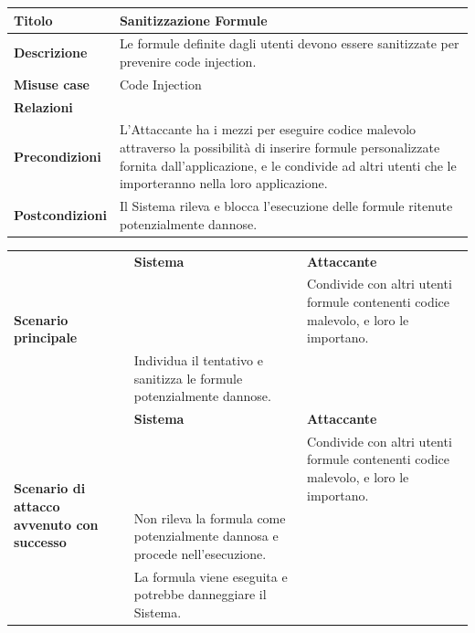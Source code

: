 \documentclass[a4paper, 11pt]{article}
\begin{document}
\clearpage
\begin{table}[h]\small
\begin{center}
\begin{tabular}{ |p{4cm}|p{11cm}|  }
\hline
\textbf{Titolo} & Sanitizzazione Formule \\
\hline
\textbf{Descrizione} & Le formule definite dagli utenti devono essere sanitizzate per prevenire code injection. \\
\hline
\textbf{Misuse case} & Code Injection \\
\hline
\textbf{Relazioni} &  \\
\hline
\textbf{Precondizioni} & L’Attaccante ha i mezzi per eseguire codice malevolo attraverso la possibilità di inserire formule personalizzate fornita dall'applicazione, e le condivide ad altri utenti che le importeranno nella loro applicazione. \\
\hline
\textbf{Postcondizioni} & Il Sistema rileva e blocca l'esecuzione delle formule ritenute potenzialmente dannose. \\
\hline
\end{tabular}
    \begin{tabular}{|p{4cm}|p{4.9cm}|p{5cm}|}
        \multirow{3}{=}{\textbf{Scenario principale}} & \textbf{Sistema} & \textbf{Attaccante}\\\cline{2-3}
        && Condivide con altri utenti formule contenenti codice malevolo, e loro le importano.\\\cline{2-3}
        & Individua il tentativo e sanitizza le formule potenzialmente dannose. & \\\cline{2-3}
         \hline
         \multirow{5}{=}{\textbf{Scenario di attacco avvenuto con successo}} & \textbf{Sistema} & \textbf{Attaccante}\\\cline{2-3}
         && Condivide con altri utenti formule contenenti codice malevolo, e loro le importano.\\\cline{2-3}
         & Non rileva la formula come potenzialmente dannosa e procede nell'esecuzione. & \\\cline{2-3}
         & La formula viene eseguita e potrebbe danneggiare il Sistema. & \\\cline{2-3}
    \hline
    \end{tabular}
\end{center}
\end{table}

\clearpage
\newpage
\end{document}

